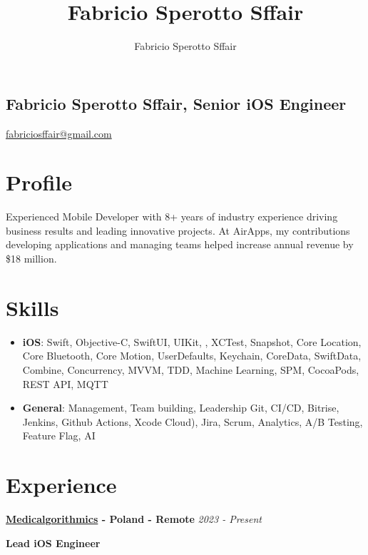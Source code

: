 \documentclass[11pt, oneside]{article}
\title{Fabricio Sperotto Sffair}
\author{Fabricio Sperotto Sffair}
\begin{document}
\begin{center}
    \section*{Fabricio Sperotto Sffair, Senior iOS Engineer}
    
    \href{https://www.linkedin.com/in/fabriciosffair/}{\faLinkedin \quad} \href{https://github.com/fabriciosffair}{\faGithub \quad}
    \href{mailto:fabriciosffair@gmail.com}{fabriciosffair@gmail.com}
\end{center}

\section*{Profile}

Experienced Mobile Developer with 8+ years of industry experience driving business results and leading innovative projects. At AirApps, my contributions developing applications and managing teams helped increase annual revenue by \$18 million.

\section*{Skills}

\begin{itemize}
    \item \textbf{iOS}: Swift, Objective-C, SwiftUI, UIKit, , XCTest, Snapshot, Core Location, Core Bluetooth, Core Motion, UserDefaults, Keychain, CoreData, SwiftData, Combine, Concurrency, MVVM, TDD, Machine Learning, SPM, CocoaPods, REST API, MQTT
    \item \textbf{General}:  Management, Team building, Leadership Git, CI/CD, Bitrise, Jenkins, Github Actions, Xcode Cloud), Jira, Scrum, Analytics, A/B Testing, Feature Flag, AI
\end{itemize}

\section*{Experience}

\textbf{\href{https://www.medicalgorithmics.com}{Medicalgorithmics} - Poland - Remote}
\hfill
\textit{2023 - Present}

\textbf{Lead iOS Engineer}
\end{document}
